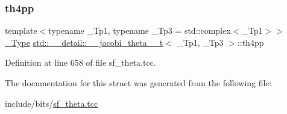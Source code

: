 \subsubsection{\texorpdfstring{th4pp}{th4pp}}
{\footnotesize\ttfamily template$<$typename \+\_\+\+Tp1, typename \+\_\+\+Tp3 = std\+::complex$<$\+\_\+\+Tp1$>$$>$ \\
\hyperlink{structstd_1_1____detail_1_1____jacobi__theta__0__t_a4aebcbdd8f3ab416a2fa770aa3784d63}{\+\_\+\+Type} \hyperlink{structstd_1_1____detail_1_1____jacobi__theta__0__t}{std\+::\+\_\+\+\_\+detail\+::\+\_\+\+\_\+jacobi\+\_\+theta\+\_\+\_\+t}$<$ \+\_\+\+Tp1, \+\_\+\+Tp3 $>$\+::th4pp}



Definition at line 658 of file sf\+\_\+theta.\+tcc.



The documentation for this struct was generated from the following file\+:\begin{DoxyCompactItemize}
\item 
include/bits/\hyperlink{sf__theta_8tcc}{sf\+\_\+theta.\+tcc}\end{DoxyCompactItemize}
